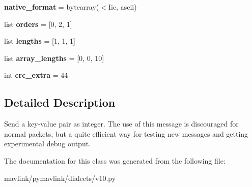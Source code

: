 \begin{DoxyCompactItemize}
{\bfseries native\+\_\+format} = bytearray(\textquotesingle{}$<$Iic\textquotesingle{}, \textquotesingle{}ascii\textquotesingle{})
\item 
\mbox{\label{classpymavlink_1_1dialects_1_1v10_1_1MAVLink__named__value__int__message_abc56a77f7e979f6ec42a3cb86517e5e7}} 
list {\bfseries orders} = \mbox{[}0, 2, 1\mbox{]}
\item 
\mbox{\label{classpymavlink_1_1dialects_1_1v10_1_1MAVLink__named__value__int__message_aa33be74dabb2026ef3a6d86bb3216678}} 
list {\bfseries lengths} = \mbox{[}1, 1, 1\mbox{]}
\item 
\mbox{\label{classpymavlink_1_1dialects_1_1v10_1_1MAVLink__named__value__int__message_a284617c350d26d482b1d54c9da388864}} 
list {\bfseries array\+\_\+lengths} = \mbox{[}0, 0, 10\mbox{]}
\item 
\mbox{\label{classpymavlink_1_1dialects_1_1v10_1_1MAVLink__named__value__int__message_a85fba8a340d338d0fe9411b2be4950f0}} 
int {\bfseries crc\+\_\+extra} = 44
\end{DoxyCompactItemize}


\subsection{Detailed Description}
\begin{DoxyVerb}Send a key-value pair as integer. The use of this message is
discouraged for normal packets, but a quite efficient way for
testing new messages and getting experimental debug output.
\end{DoxyVerb}
 

The documentation for this class was generated from the following file\+:\begin{DoxyCompactItemize}
\item 
mavlink/pymavlink/dialects/v10.\+py\end{DoxyCompactItemize}
